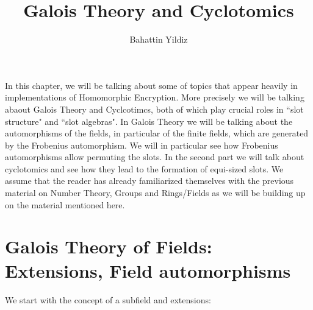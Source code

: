 \documentclass[12pt]{article}
\title{Galois Theory and Cyclotomics}
\author{Bahattin Yildiz }
\theoremstyle{plain}
\theoremstyle{definition}
\theoremstyle{remark}
\begin{document}
\date{}

\maketitle
In this chapter, we will be talking about some of topics that appear heavily in implementations of Homomorphic Encryption. More precisely we will be talking abaout Galois Theory and Cyclcotimcs, both of which play crucial roles in ``slot structure" and ``slot algebras". In Galois Theory we will be talking about the automorphisms of the fields, in particular of the finite fields, which are generated by the Frobenius automorphism. We will in particular see how Frobenius automorphisms allow permuting the slots. In the second part we will talk about cyclotomics and see how they lead to the formation of equi-sized slots. We assume that the reader has already familiarized themselves with the previous material on Number Theory, Groups and Rings/Fields as we will be building up on the material mentioned here. 


 \section{Galois Theory of Fields: Extensions, Field automorphisms}
We start with the concept of a subfield and extensions:
\end{document}
